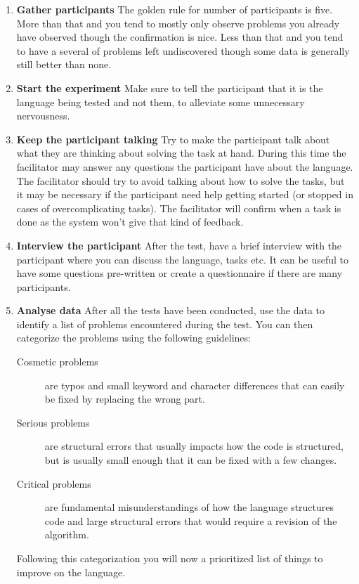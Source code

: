 \begin{enumerate}
\item \textbf{Gather participants} The golden rule for number of participants is five. More than that and you tend to mostly only observe problems you already have observed though the confirmation is nice. Less than that and you tend to have a several of problems left undiscovered though some data is generally still better than none.
\item \textbf{Start the experiment} Make sure to tell the participant that it is the language being tested and not them, to alleviate some unnecessary nervousness.
\item \textbf{Keep the participant talking} Try to make the participant talk about what they are thinking about solving the task at hand. During this time the facilitator may answer any questions the participant have about the language. The facilitator should try to avoid talking about how to solve the tasks, but it may be necessary if the participant need help getting started (or stopped in cases of overcomplicating tasks). The facilitator will confirm when a task is done as the system won't give that kind of feedback.
\item \textbf{Interview the participant} After the test, have a brief interview with the participant where you can discuss the language, tasks etc. It can be useful to have some questions pre-written or create a questionnaire if there are many participants.
\item \textbf{Analyse data} After all the tests have been conducted, use the data to identify a list of problems encountered during the test. You can then categorize the problems using the following guidelines:
\begin{description}
\item[Cosmetic problems] are typos and small keyword and character differences that can easily be fixed by replacing the wrong part.
\item[Serious problems] are structural errors that usually impacts how the code is structured, but is usually small enough that it can be fixed with a few changes.
\item[Critical problems] are fundamental misunderstandings of how the language structures code and large structural errors that would require a revision of the algorithm.
\end{description}
Following this categorization you will now a prioritized list of things to improve on the language.
\end{enumerate}

